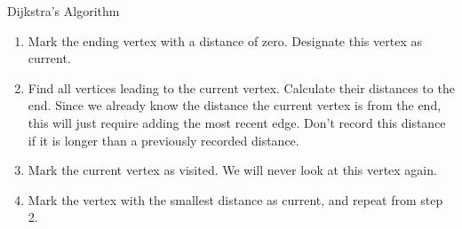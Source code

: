 \begin{algorithm}{Dijkstra's Algorithm}{}
\hspace{3in}

\begin{enumerate}
\item	Mark the ending vertex with a distance of zero.  Designate this vertex as current.
\item Find all vertices leading to the current vertex.  Calculate their distances to the end.  Since we already know the distance the current vertex is from the end, this will just require adding the most recent edge.  Don't record this distance if it is longer than a previously recorded distance.
\item	Mark the current vertex as visited.  We will never look at this vertex again.
\item	Mark the vertex with the smallest distance as current, and repeat from step 2.
\end{enumerate}
 \end{algorithm}

